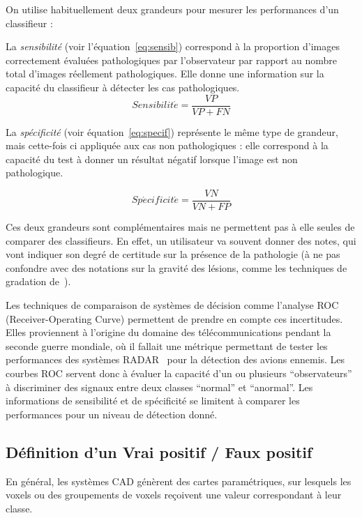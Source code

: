 On utilise habituellement deux grandeurs pour mesurer les performances d'un classifieur :

La \emph{sensibilité} (voir l'équation~\ref{eq:sensib}) correspond à la proportion d'images correctement évaluées pathologiques par l'observateur par rapport au nombre total d'images réellement pathologiques. Elle donne une information sur la capacité du classifieur à détecter les cas pathologiques.
\label{lab:pressensib}
\begin{equation}
	\label{eq:sensib}
	Sensibilit\acute{e} = \frac{VP}{VP + FN}
\end{equation}

La \emph{spécificité} (voir équation~\ref{eq:specif}) représente le même type de grandeur, mais cette-fois ci appliquée aux cas non pathologiques : elle correspond à la capacité du test à donner un résultat négatif lorsque l'image est non pathologique.

\begin{equation}
	\label{eq:specif}
	Sp\acute{e}cificit\acute{e} = \frac{VN}{VN + FP}
\end{equation}

Ces deux grandeurs sont complémentaires mais ne permettent pas à elle seules de comparer des classifieurs. En effet, un  utilisateur va souvent donner des notes, qui vont indiquer son degré de certitude sur la présence de la pathologie (à ne pas confondre avec des notations sur la gravité des lésions, comme les techniques de gradation de~\cite{genestie1998comparison}).

Les techniques de comparaison de systèmes de décision comme l'analyse ROC (Receiver-Operating Curve) permettent de prendre en compte ces incertitudes. Elles proviennent à l'origine du domaine des télécommunications pendant la seconde guerre mondiale, où il fallait une métrique permettant de tester les performances des systèmes RADAR~\cite{zou2007receiver} pour la détection des avions ennemis. Les courbes ROC servent donc à évaluer la capacité d'un ou plusieurs ``observateurs'' à discriminer des signaux entre deux classes ``normal'' et ``anormal''. Les informations de sensibilité et de spécificité se limitent à comparer les performances pour un niveau de détection donné.

\subsection{Définition d'un Vrai positif / Faux positif}

En général, les systèmes CAD génèrent des cartes paramétriques, sur lesquels les voxels ou des groupements de voxels reçoivent une valeur correspondant à leur classe. 

